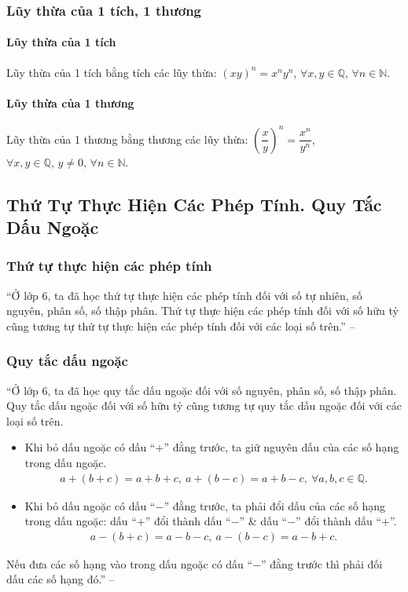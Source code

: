 \documentclass{article}
\numberwithin{equation}{section}
\begin{document}
\subsubsection{Lũy thừa của 1 tích, 1 thương}

\paragraph{Lũy thừa của 1 tích}
Lũy thừa của 1 tích bằng tích các lũy thừa: $(xy)^n = x^ny^n$, $\forall x,y\in\mathbb{Q},\,\forall n\in\mathbb{N}$.

\paragraph{Lũy thừa của 1 thương}
Lũy thừa của 1 thương bằng thương các lũy thừa: $\left(\dfrac{x}{y}\right)^n = \dfrac{x^n}{y^n}$, $\forall x,y\in\mathbb{Q},\,y\ne 0,\,\forall n\in\mathbb{N}$.

\subsection{Thứ Tự Thực Hiện Các Phép Tính. Quy Tắc Dấu Ngoặc}

\subsubsection{Thứ tự thực hiện các phép tính}
``Ở lớp 6, ta đã học thứ tự thực hiện các phép tính đối với số tự nhiên, số nguyên, phân số, số thập phân. Thứ tự thực hiện các phép tính đối với số hữu tỷ cũng tương tự thứ tự thực hiện các phép tính đối với các loại số trên.'' -- \cite[p. 23]{SGK_Toan_7_Canh_Dieu_tap_1}

\subsubsection{Quy tắc dấu ngoặc}
``Ở lớp 6, ta đã học quy tắc dấu ngoặc đối với số nguyên, phân số, số thập phân. Quy tắc dấu ngoặc đối với số hữu tỷ cũng tương tự quy tắc dấu ngoặc đối với các loại số trên.
\begin{itemize}
	\item Khi bỏ dấu ngoặc có dấu ``$+$'' đằng trước, ta giữ nguyên dấu của các số hạng trong dấu ngoặc.
	\begin{align*}
		a + (b + c) = a + b + c,\ a + (b - c) = a + b - c,\ \forall a,b,c\in\mathbb{Q}.
	\end{align*}
	\item Khi bỏ dấu ngoặc có dấu ``$-$'' đằng trước, ta phải đổi dấu của các số hạng trong dấu ngoặc: dấu ``$+$'' đổi thành dấu ``$-$'' \& dấu ``$-$'' đổi thành dấu ``$+$''.
	\begin{align*}
		a - (b + c) = a - b - c,\ a - (b - c) = a - b + c.
	\end{align*}
\end{itemize}
Nếu đưa các số hạng vào trong dấu ngoặc có dấu ``$-$'' đằng trước thì phải đối dấu các số hạng đó.'' -- \cite[p. 24]{SGK_Toan_7_Canh_Dieu_tap_1}
\end{document}

